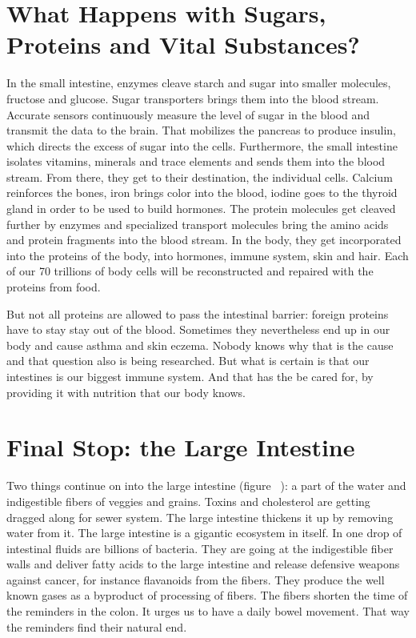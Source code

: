 \documentclass[../main.tex]{subfiles}
\begin{document}
\section[What happens with food?]{What Happens with Sugars, Proteins and Vital Substances?}

In the small intestine, enzymes cleave starch and sugar into smaller molecules, fructose and glucose.
Sugar transporters brings them into the blood stream.
Accurate sensors continuously measure the level of sugar in the blood and transmit the data to the brain.
That mobilizes the pancreas to produce insulin, which directs the excess of sugar into the cells.
Furthermore, the small intestine isolates vitamins, minerals and trace elements and sends them into the blood stream.
From there, they get to their destination, the individual cells.
Calcium reinforces the bones, iron brings color into the blood, iodine goes to the thyroid gland in order to be used to build hormones.
The protein molecules get cleaved further by enzymes
and specialized transport molecules bring the amino acids and protein fragments into the blood stream.
In the body, they get incorporated into the proteins of the body, into hormones, immune system, skin and hair.
Each of our 70 trillions of body cells will be reconstructed and repaired with the proteins from food.

But not all proteins are allowed to pass the intestinal barrier: foreign proteins have to stay stay out of the blood.
Sometimes they nevertheless end up in our body and cause asthma and skin eczema.
Nobody knows why that is the cause and that question also is being researched.
But what is certain is that our intestines is our biggest immune system.
And that has the be cared for, by providing it with nutrition that our body knows.

\section{Final Stop: the Large Intestine}

Two things continue on into the large intestine (figure~%
): a part of the water and indigestible fibers of veggies and grains. 
Toxins and cholesterol are getting dragged along for sewer system.
The large intestine thickens it up by removing water from it.
The large intestine is a gigantic ecosystem in itself.
In one drop of intestinal fluids are billions of bacteria.
They are going at the indigestible fiber walls and deliver fatty acids to the large intestine
and release defensive weapons against cancer, for instance flavanoids from the fibers.
They produce the well known gases as a byproduct of processing of fibers.
The fibers shorten the time of the reminders in the colon.
It urges us to have a daily bowel movement.
That way the reminders find their natural end.
\end{document}
